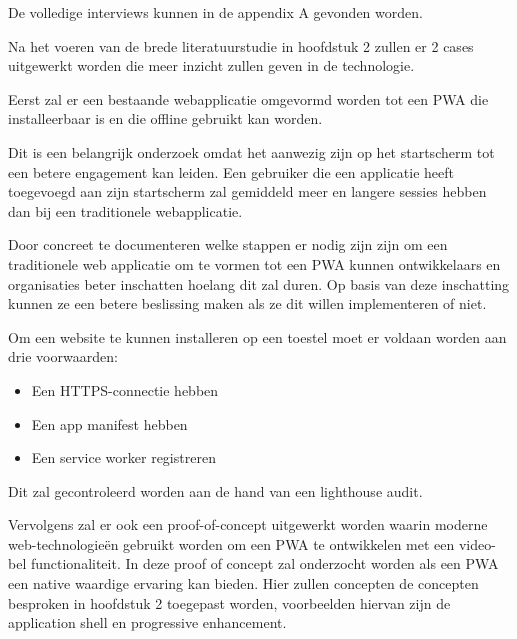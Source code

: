 De volledige interviews kunnen in de appendix A gevonden worden.

Na het voeren van de brede literatuurstudie in hoofdstuk 2 zullen er 2 cases uitgewerkt worden die meer inzicht zullen geven in de technologie.


Eerst zal er een bestaande webapplicatie omgevormd worden tot een PWA die installeerbaar is en die offline gebruikt kan worden.

Dit is een belangrijk onderzoek omdat het aanwezig zijn op het startscherm tot een betere engagement kan leiden. Een gebruiker die een applicatie heeft toegevoegd aan zijn startscherm zal gemiddeld meer en langere sessies hebben dan bij een traditionele webapplicatie.
 \autocite{LePage2020b}

Door concreet te documenteren welke stappen er nodig zijn zijn om een traditionele web applicatie om te vormen tot een PWA kunnen ontwikkelaars en organisaties beter inschatten hoelang dit zal duren.
Op basis van deze inschatting kunnen ze een betere beslissing maken als ze dit willen implementeren of niet.

Om een website te kunnen installeren op een toestel moet er voldaan worden aan drie voorwaarden:
\begin{itemize}
	\item Een HTTPS-connectie hebben
	\item Een app manifest hebben
	\item Een service worker registreren
\end{itemize}

Dit zal gecontroleerd worden aan de hand van een lighthouse audit.
	

Vervolgens zal er ook een proof-of-concept uitgewerkt worden waarin moderne web-technologieën gebruikt worden om een PWA te ontwikkelen met een video-bel functionaliteit. In deze proof of concept zal onderzocht worden als een PWA een native waardige ervaring kan bieden. Hier zullen concepten de concepten besproken in hoofdstuk 2 toegepast worden, voorbeelden hiervan zijn de application shell en  progressive enhancement.





